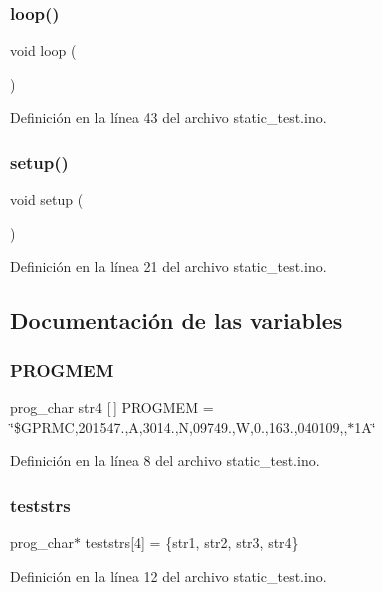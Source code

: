 \subsubsection{\texorpdfstring{loop()}{loop()}}
{\footnotesize\ttfamily void loop (\begin{DoxyParamCaption}{ }\end{DoxyParamCaption})}



Definición en la línea 43 del archivo static\+\_\+test.\+ino.

\mbox{\label{static__test_8ino_a4fc01d736fe50cf5b977f755b675f11d}} 
\subsubsection{\texorpdfstring{setup()}{setup()}}
{\footnotesize\ttfamily void setup (\begin{DoxyParamCaption}{ }\end{DoxyParamCaption})}



Definición en la línea 21 del archivo static\+\_\+test.\+ino.



\subsection{Documentación de las variables}
\mbox{\label{static__test_8ino_a37dd2e5939ed07e6228272db05427f31}} 
\subsubsection{\texorpdfstring{P\+R\+O\+G\+M\+EM}{PROGMEM}}
{\footnotesize\ttfamily prog\+\_\+char str4 \mbox{[}$\,$\mbox{]} P\+R\+O\+G\+M\+EM = \char`\"{}\$G\+P\+R\+MC,201547.,A,3014.,N,09749.,W,0.,163.,040109,,$\ast$1\+A\char`\"{}}



Definición en la línea 8 del archivo static\+\_\+test.\+ino.

\mbox{\label{static__test_8ino_a0a3cd97c1566952d62849717668e2174}} 
\subsubsection{\texorpdfstring{teststrs}{teststrs}}
{\footnotesize\ttfamily prog\+\_\+char$\ast$ teststrs\mbox{[}4\mbox{]} = \{str1, str2, str3, str4\}}



Definición en la línea 12 del archivo static\+\_\+test.\+ino.

